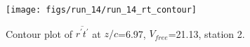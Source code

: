 \begin{figure}[H]
\centering
\texttt{[image: figs/run\_14/run\_14\_rt\_contour]}
\caption{Contour plot of $\overline{r^\prime t^\prime}$ at $z/c$=6.97, $V_{free}$=21.13, station 2.}
\label{fig:run_14_rt_contour}
\end{figure}


